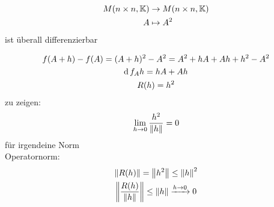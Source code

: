 \begin{Sat}
  \begin{align*}
    M(n\times n, \mathbb{K})&\to M(n\times n,\mathbb{K})\\
    A&\mapsto A^2
  \end{align*}
  ist überall differenzierbar
\end{Sat}
\begin{Bew}
  \begin{gather*}
    f(A+h)-f(A)=(A+h)^2-A^2=A^2+hA+Ah+h^2-A^2\\
    \operatorname{d} f_Ah=hA+Ah\\
    R(h)=h^2
  \end{gather*}
  zu zeigen:
  \[\displaystyle\lim_{h\rightarrow0}\frac{h^2}{\left\| h \right\|}=0\]
  für irgendeine Norm\\
  Operatornorm:
  \begin{gather*}
    \left\| R(h) \right\|=\left\| h^2 \right\|\leq\left\| h \right\|^2\\
    \left\| \frac{R(h)}{\left\| h \right\|} \right\|\leq\left\| h \right\|\xrightarrow{h\to 0}0
  \end{gather*}
\end{Bew}
